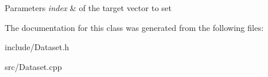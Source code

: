 \begin{DoxyParams}{Parameters}
{\em index} & of the target vector to set \\
\hline
\end{DoxyParams}


The documentation for this class was generated from the following files\-:\begin{DoxyCompactItemize}
\item 
include/Dataset.\-h\item 
src/Dataset.\-cpp\end{DoxyCompactItemize}
